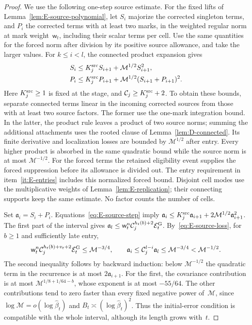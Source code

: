 \begin{proof}
We use the following one-step source estimate. For the fixed lifts of Lemma~\ref{lem:E-source-polynomial}, let $S_i$ majorize the corrected singleton terms, and $P_i$ the corrected terms with at least two marks, in the weighted regular norm at mark weight~$\mathsf w_t$, including their scalar terms per cell. Use the same quantities for the forced norm after division by its positive source allowance, and take the larger values. For $k\le i<l$, the connected product expansion gives
\begin{align}\label{eq:E-source-step}
 S_i&\le K_j^{\rm src} S_{i+1}+\mathcal M^{1/2}S_{i+1}^2,\notag\\
 P_i&\le K_j^{\rm src} P_{i+1}
          +\mathcal M^{1/2}(S_{i+1}+P_{i+1})^2.
\end{align}
Here $K_j^{\rm src}\ge1$ is fixed at the stage, and $\mathcal C_j\ge K_j^{\rm src}+2$. To obtain these bounds, separate connected terms linear in the incoming corrected sources from those with at least two source factors. The former use the one-mark integration bound. In the latter, the product rule leaves a product of two source norms; summing the additional attachments uses the rooted clause of Lemma~\ref{lem:D-connected}. Its finite derivative and localization losses are bounded by $\mathcal M^{1/2}$ after entry. Every higher product is absorbed in the same quadratic bound while the source norm is at most $\mathcal M^{-1/2}$. For the forced terms the retained eligibility event supplies the forced suppression before its allowance is divided out. The entry requirement in item~\ref{it:E-entries} includes this normalized forced bound. Disjoint cell modes use the multiplicative weights of Lemma~\ref{lem:E-replication}; their connecting supports keep the same estimate. No factor counts the number of cells.

Set $\mathfrak a_i=S_i+P_i$. Equations~\eqref{eq:E-source-step} imply $\mathfrak a_i\le K_j^{\rm src}\mathfrak a_{i+1}+2\mathcal M^{1/2}\mathfrak a_{i+1}^2$. The first part of the interval gives $\mathfrak a_l\le\mathsf w_t^n\mathcal C_j^{h_t(b)+2}\mathcal E_t^{\rm G}$. By~\eqref{eq:E-source-loss}, for $b\ge1$ and sufficiently late entry,
\begin{equation}\label{eq:E-source-iteration}
 \mathsf w_t^n\mathcal C_j^{h_t(b)+v_t+2}\mathcal E_t^{\rm G}
 \le\mathcal M^{-3/4},\qquad
 \mathfrak a_i\le\mathcal C_j^{l-i}\mathfrak a_l\le\mathcal M^{-3/4}<\mathcal M^{-1/2}.
\end{equation}
The second inequality follows by backward induction: below $\mathcal M^{-1/2}$ the quadratic term in the recurrence is at most $2\mathfrak a_{i+1}$. For the first, the covariance contribution is at most $\mathcal M^{1/8+1/64-b}$, whose exponent is at most $-55/64$. The other contributions tend to zero faster than every fixed negative power of~$\mathcal M$, since $\log\mathcal M=o(\log\widehat\beta_t)$ and $B_t\asymp(\log\widehat\beta_t)^2$. Thus the initial-error condition is compatible with the whole interval, although its length grows with~$t$.


\end{proof}
